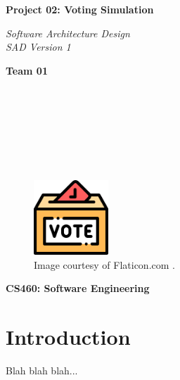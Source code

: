 \documentclass{article}
\begin{document}
\begin{titlepage}
\begin{center}
\vspace*{1cm}

\Huge
\textbf{Project 02: Voting Simulation}

\vspace{0.5cm}
\Large
\textit{Software Architecture Design} \\
\textit{SAD Version 1}

\vspace{1cm}

\textbf{Team 01}

\vspace{0.5cm}

 \\
 \\
 \\
 \\
 \\
 \\

\vspace{1cm}

\begin{figure}[h]
    \centering
    \includegraphics[width=0.25\textwidth]{docs/sad/figures/ballot_icon.png}
    \caption*{Image courtesy of Flaticon.com \cite{Flaticon_2019}.}
    \label{fig:safeIcon}
\end{figure}

\vspace{7cm}

\Large
\textbf{CS460: Software Engineering} \\

\end{center}
\end{titlepage}

\newpage

\tableofcontents

\newpage

\section{Introduction}
Blah blah blah...
\end{document}
